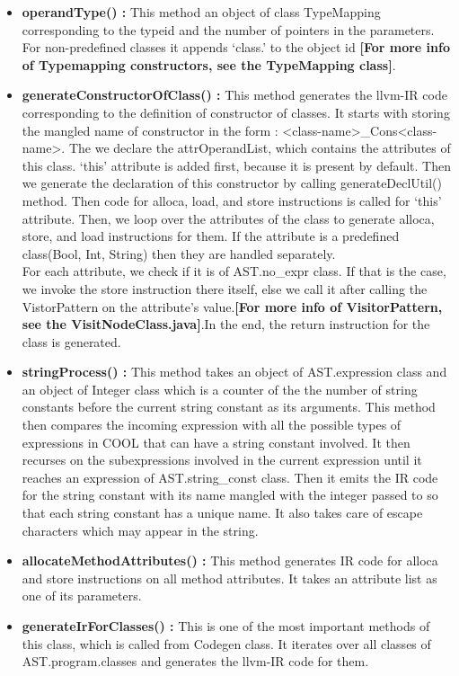 \documentclass{article}
\begin{document}
\begin{itemize}
\begin{itemize}
    \end{itemize}
    \item \textbf{operandType() :} This method an object of class TypeMapping corresponding to the typeid and the number of pointers in the parameters. For non-predefined classes it appends ‘class.’ to the object id \textbf{[For more info of Typemapping constructors, see the TypeMapping class]}.
    \item \textbf{generateConstructorOfClass() :} This method generates the llvm-IR code corresponding to the definition of constructor of classes. It starts with storing the mangled name of constructor in the form : <class-name>\_Cons<class-name>. The we declare the attrOperandList, which contains the attributes of this class. ‘this’ attribute is added first, because it is present by default. Then we generate the declaration of this constructor by calling generateDeclUtil() method. Then code for alloca, load, and store instructions is called for ‘this’ attribute. Then, we loop over the attributes of the class to generate alloca, store, and load instructions for them. If the attribute is a predefined class(Bool, Int, String) then they are handled separately. \\
    For each attribute, we check if it is of AST.no\_expr class. If that is the case, we invoke the store instruction there itself, else we call it after calling the VistorPattern on the attribute’s value.\textbf{[For more info of VisitorPattern, see the VisitNodeClass.java]}.In the end, the return instruction for the class is generated.

    \item \textbf{stringProcess() :} This method takes an object of AST.expression class and an object of Integer class which is a counter of the the number of string constants before the current string constant as its arguments. This method then compares the incoming expression with all the possible types of expressions in COOL that can have a string constant involved. It then recurses on the subexpressions involved in the current expression until it reaches an expression of AST.string\_const class. Then it emits the IR code for the string constant with its name mangled with the integer passed to so that each string constant has a unique name. It also takes care of escape characters which may appear in the string.
    \item \textbf{allocateMethodAttributes() :} This method generates IR code for alloca and store  instructions on all method attributes. It takes an attribute list as one of its parameters.
    \item \textbf{generateIrForClasses() :} This is one of the most important methods of this class, which is called from Codegen class. It iterates over all classes of AST.program.classes and generates the llvm-IR code for them.
   
\end{itemize}
\end{document}
